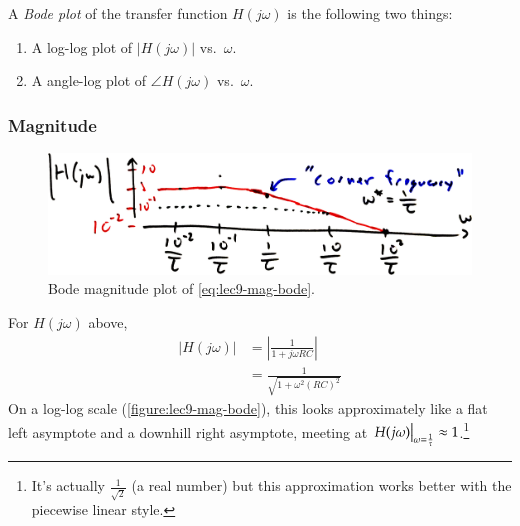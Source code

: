 A \emph{Bode plot} of the transfer function \(H(j\omega)\) is the following two things:
\begin{enumerate}
  \item A log-log plot of \(\left|H(j\omega)\right|\) vs.\ \(\omega\).
  \item A angle-log plot of \(\angle H(j\omega)\) vs.\ \(\omega\).
\end{enumerate}

\subsubsection{Magnitude}
\begin{figure}
  \centering
  \includegraphics[width=0.7\linewidth]{figures/9/magnitude-bode}
  \caption{Bode magnitude plot of \autoref{eq:lec9-mag-bode}.}
  \label{figure:lec9-mag-bode}
\end{figure}
For \(H(j\omega)\) above,
\begin{align}
  \left|H(j\omega)\right|
  &= \left| \frac{1}{1 + j\omega RC} \right| \\
  &= \frac{1}{\sqrt{1 + \omega^2 (RC)^2}}
\end{align}
On a log-log scale (\autoref{figure:lec9-mag-bode}), this looks approximately like a flat left asymptote and a downhill right asymptote, meeting at \(\eval{H(j\omega)}_{\omega = \frac{1}{\tau}} \approx 1\).\footnote{It's actually \(\frac{1}{\sqrt 2}\) (a real number) but this approximation works better with the piecewise linear style.}

